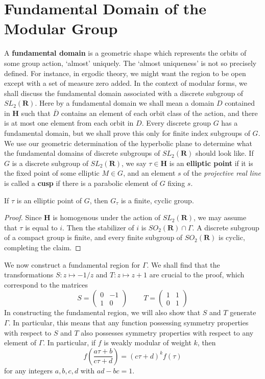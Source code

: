 \section{Fundamental Domain of the Modular Group}

A {\bf fundamental domain} is a geometric shape which represents the orbits of some group action, `almost' uniquely. The `almost uniqueness' is not so precisely defined. For instance, in ergodic theory, we might want the region to be open except with a set of measure zero added. In the context of modular forms, we shall discuss the fundamental domain associated with a discrete subgroup of $SL_2(\mathbf{R})$. Here by a fundamental domain we shall mean a domain $D$ contained in $\mathbf{H}$ such that $\overline{D}$ contains an element of each orbit class of the action, and there is at most one element from each orbit in $D$. Every discrete group $G$ has a fundamental domain, but we shall prove this only for finite index subgroups of $G$. We use our geometric determination of the hyperbolic plane to determine what the fundamental domains of discrete subgroups of $SL_2(\mathbf{R})$ should look like. If $G$ is a discrete subgroup of $SL_2(\mathbf{R})$, we say $\tau \in \mathbf{H}$ is an {\bf elliptic point} if it is the fixed point of some elliptic $M \in G$, and an element $s$ of the {\it projective real line} is called a {\bf cusp} if there is a parabolic element of $G$ fixing $s$.

\begin{theorem}
    If $\tau$ is an elliptic point of $G$, then $G_\tau$ is a finite, cyclic group.
\end{theorem}
\begin{proof}
    Since $\mathbf{H}$ is homogenous under the action of $SL_2(\mathbf{R})$, we may assume that $\tau$ is equal to $i$. Then the stabilizer of $i$ is $SO_2(\mathbf{R}) \cap \Gamma$. A discrete subgroup of a compact group is finite, and every finite subgroup of $SO_2(\mathbf{R})$ is cyclic, completing the claim.
\end{proof}

We now construct a fundamental region for $\Gamma$. We shall find that the transformations $S: z \mapsto -1/z$ and $T: z \mapsto z + 1$ are crucial to the proof, which correspond to the matrices
%
\[ S = \begin{pmatrix} 0 & -1 \\ 1 & 0 \end{pmatrix}\ \ \ \ \ \ \ \ \ \ T = \begin{pmatrix} 1 & 1 \\ 0 & 1 \end{pmatrix} \]
%
In constructing the fundamental region, we will also show that $S$ and $T$ generate $\Gamma$. In particular, this means that any function possessing symmetry properties with respect to $S$ and $T$ also possesses symmetry properties with respect to any element of $\Gamma$. In particular, if $f$ is weakly modular of weight $k$, then
%
\[ f \left( \frac{a\tau + b}{c \tau + d} \right) = (c\tau + d)^k f(\tau) \]
%
for any integers $a,b,c,d$ with $ad - bc = 1$.

